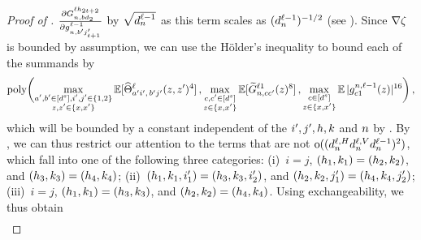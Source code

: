 \begin{proof}[Proof of ]
    $
        \frac{
            \partial 
            G_{n, b d_2}^{\ell h_{2t + 2}}
        }{
            \partial g_{n, b' j'_{t+1}}^{\ell - 1}
        }
    $
    by $\sqrt{d_{n}^{\ell - 1}}$ as this term scales as $(d_{n}^{\ell - 1})^{-1/2}$ (see ).
    Since $\nabla \zeta$ is bounded by assumption, we can use the H{\" o}lder's inequality to bound each of the summands by
    \begin{align*}
        \operatorname{poly} \biggl(
            \max_{\substack{
                a', b' \in [d^s],
                i', j' \in \{ 1, 2 \} \\
                z, z' \in \{ x, x' \}
            }}
                \operatorname*{\mathbb{E}} [
                    \widehat{\Theta}_{
                        a' i' , \,
                        b' j'
                    }^{\ell} (z, z')^4
                ]
            \, ,
            \max_{\substack{
                c, c' \in [d^s]  \\
                z \in \{ x , x' \}
            }}
                \operatorname*{\mathbb{E}} [
                    \widetilde{G}_{n, c c'}^{\ell 1} (z)^8
                ]
            \, ,
            \max_{\substack{c \in [d^s] \\ z \in \{ x, x' \}}}
                \operatorname*{\mathbb{E}} | {g}^{n, \ell - 1}_{c 1}{(z)} |^{16}
        \biggr)
        \, ,
    \end{align*}
    which will be bounded by a constant independent of the $i', j', h, k$ and $n$ by .
    By , we can thus restrict our attention to the terms that are not $\mathrm{o}((d_{n}^{\ell, H} d_{n}^{\ell, V} d_{n}^{\ell - 1})^2)$, which fall into one of the following three categories: 
    (i)~$i = j$, $(h_1, k_1) = (h_2 , k_2)$, and $(h_3, k_3) = (h_4, k_4)$; 
    (ii)~$(h_1, k_1, i'_1) = (h_3 , k_3, i'_2)$, and $(h_2, k_2, j'_1) = (h_4, k_4, j'_2)$; 
    (iii)~$i = j$, $(h_1, k_1) = (h_3, k_3)$, and $(h_2 , k_2) = (h_4, k_4)$.
    Using exchangeability, we thus obtain
    \begin{align}\label{eq:gv_square}

\end{align}
\end{proof}
